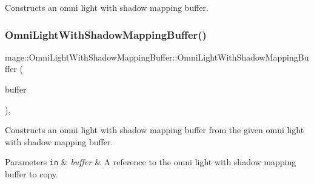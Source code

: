 Constructs an omni light with shadow mapping buffer. \hypertarget{structmage_1_1_omni_light_with_shadow_mapping_buffer_a062c7d94f3d6350f32c74ed27bbeb986}{}\label{structmage_1_1_omni_light_with_shadow_mapping_buffer_a062c7d94f3d6350f32c74ed27bbeb986} 
\subsubsection{\texorpdfstring{Omni\+Light\+With\+Shadow\+Mapping\+Buffer()}{OmniLightWithShadowMappingBuffer()}\hspace{0.1cm}{\footnotesize\ttfamily [2/3]}}
{\footnotesize\ttfamily mage\+::\+Omni\+Light\+With\+Shadow\+Mapping\+Buffer\+::\+Omni\+Light\+With\+Shadow\+Mapping\+Buffer (\begin{DoxyParamCaption}\item[{const \hyperlink{structmage_1_1_omni_light_with_shadow_mapping_buffer}{Omni\+Light\+With\+Shadow\+Mapping\+Buffer} \&}]{buffer }\end{DoxyParamCaption})\hspace{0.3cm}{\ttfamily [default]}, {\ttfamily [noexcept]}}

Constructs an omni light with shadow mapping buffer from the given omni light with shadow mapping buffer.


\begin{DoxyParams}[1]{Parameters}
\mbox{\tt in}  & {\em buffer} & A reference to the omni light with shadow mapping buffer to copy. \\
\hline
\end{DoxyParams}
\hypertarget{structmage_1_1_omni_light_with_shadow_mapping_buffer_a57dadfe29fd43f87713b755c15277cdf}{}\label{structmage_1_1_omni_light_with_shadow_mapping_buffer_a57dadfe29fd43f87713b755c15277cdf} 
